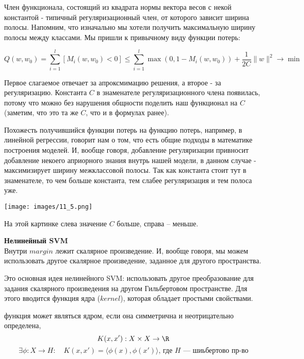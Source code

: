 Член функционала, состоящий из квадрата нормы вектора весов с некой константой - типичный регуляризационный член, от которого зависит ширина полосы. Напомним, что изначально мы хотели получить максимальную ширину полосы между классами. Мы пришли к привычному виду функции потерь:

$$Q(w, w_0) = \sum\limits_{i=1}^l[M_i(w, w_0) < 0] \leqslant \sum\limits_{i=1}^l \max(0, 1 - M_i(w, w_0)) + \frac{1}{2C}\|w\|^2 \to \min$$


Первое слагаемое отвечает за апроксмимацию решения, а второе - за регуляризацию. Константа $C$ в знаменателе регуляризационного члена появилась, потому что можно без нарушения общности поделить наш функционал на $C$ (заметим, что это та же $C$, что и в формулах ранее). 

Похожесть получившийся функции потерь на функцию потерь, например, в линейной регрессии, говорит нам о том, что есть общие подходы в математике построения моделей. И,  вообще говоря, добавление регуляризации привносит добавление некоего априорного знания внутрь нашей модели, в данном случае - максимизирует ширину межклассовой полосы. Так как константа стоит тут в знаменателе, то чем больше константа, тем слабее регуляризация и тем полоса уже. \\

\begin{center}
    \texttt{[image: images/11\_5.png]}
\end{center}

На этой картинке слева значение $C$ больше, справа -- меньше.

\textbf{Нелинейный SVM}\\

Внутри $margin$ лежит скалярное произведение. И, вообще говоря, мы можем использовать другое скалярное произведение, заданное для другого пространства.

Это основная идея нелинейного SVM: использовать другое преобразование для задания скалярного произведения на другом Гильбертовом пространстве. Для этого вводится функция ядра ($kernel$), которая обладает простыми свойствами. 

\begin{theorem} функция может являться ядром, если она симметрична и неотрицательно определена,
$$K(x, x') : X \times X \to \R$$
$$\exists \phi : X \to H : \quad K(x, x') = \langle \phi(x), \phi(x') \rangle \text{, где } H \text{ --- шиьбертово пр-во}
$$
\end{theorem}

